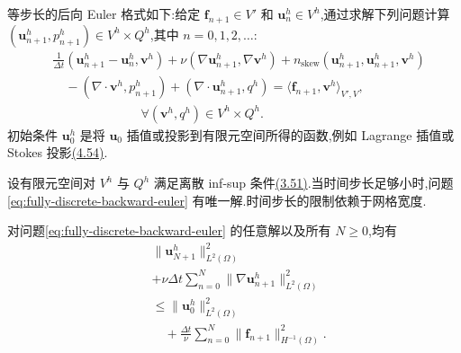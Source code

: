 \begin{note}[后向 Euler 格式]
\label{note:backward-euler-scheme}
等步长的后向 Euler 格式如下:给定 $\bm{f}_{n+1}\in V'$ 和 $\bm{u}_n^h\in V^h$,通过求解下列问题计算 $(\bm{u}_{n+1}^h,p_{n+1}^h)\in V^h\times Q^h$,其中 $n=0,1,2,\ldots$:
\begin{equation}\label{eq:fully-discrete-backward-euler}
\begin{aligned}
 &\frac1{\Delta t}(\bm{u}_{n+1}^h-\bm{u}_n^h,\bm{v}^h)
   +\nu(\nabla\bm{u}_{n+1}^h,\nabla\bm{v}^h)
   +n_{\mathrm{skew}}(\bm{u}_{n+1}^h,\bm{u}_{n+1}^h,\bm{v}^h)\\
 &\quad-(\nabla\cdot\bm{v}^h,p_{n+1}^h)
       +(\nabla\cdot\bm{u}_{n+1}^h,q^h)
    =\langle\bm{f}_{n+1},\bm{v}^h\rangle_{V',V},\\
 &\hspace{7em}\forall(\bm{v}^h,q^h)\in V^h\times Q^h.
\end{aligned}
\end{equation}
初始条件 $\bm{u}_0^h$ 是将 $\bm{u}_0$ 插值或投影到有限元空间所得的函数,例如 Lagrange 插值或 Stokes 投影\hyperref[eq:stokes-projection-definition]{(4.54)}.
\end{note}

\begin{lemma}
\label{lem:fully-discrete-backward-euler-existence-stability}
设有限元空间对 $V^h$ 与 $Q^h$ 满足离散 inf-sup 条件\hyperref[eq:discrete-infsup-condition]{(3.51)}.当时间步长足够小时,问题\cref{eq:fully-discrete-backward-euler} 有唯一解.时间步长的限制依赖于网格宽度.

对问题\cref{eq:fully-discrete-backward-euler} 的任意解以及所有 $N\ge0$,均有
\begin{equation}\label{eq:fully-discrete-backward-euler-stability}
  \begin{aligned}
    &\|\bm{u}_{N+1}^h\|_{L^2(\Omega)}^2\\
    &+\nu\Delta t\sum_{n=0}^{N}
         \|\nabla\bm{u}_{n+1}^h\|_{L^2(\Omega)}^2\\
    &\le \|\bm{u}_0^h\|_{L^2(\Omega)}^2\\
    &\quad+\frac{\Delta t}{\nu}\sum_{n=0}^{N}
         \|\bm{f}_{n+1}\|_{H^{-1}(\Omega)}^2.
  \end{aligned}
\end{equation}
\end{lemma}

